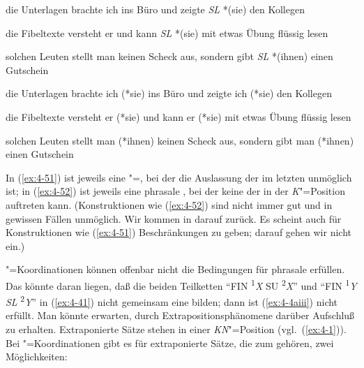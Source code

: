 \documentclass[output=paper]{langsci/langscibook}
\begin{document}
\begin{exe}
\ex
\label{ex:4-51}
\begin{xlist}
\ex%
\label{ex:4-51a}
die Unterlagen brachte ich ins Büro und zeigte \textit{SL} *(sie) den Kollegen

\ex%
\label{ex:4-51b}
die Fibeltexte versteht er und kann \textit{SL} *(sie) mit etwas Übung flüssig lesen

\ex%
\label{ex:4-51c}
solchen Leuten stellt man keinen Scheck aus, sondern gibt \textit{SL} *(ihnen) einen Gutschein
\end{xlist}
\ex
\label{ex:4-52}
\begin{xlist}
\ex%
\label{ex:4-52a}
die Unterlagen brachte ich (*sie) ins Büro und zeigte ich (*sie) den Kollegen


\ex%
\label{ex:4-52b}
die Fibeltexte versteht er (*sie) und kann er (*sie) mit etwas Übung flüssig lesen

\ex%
\label{ex:4-52c}
solchen Leuten stellt man (*ihnen) keinen Scheck aus, sondern gibt man (*ihnen) einen Gutschein
\end{xlist}
\end{exe}
In (\ref{ex:4-51}) ist jeweils eine "=, bei der die
Auslassung der  im letzten  unmöglich ist; in
(\ref{ex:4-52}) ist jeweils eine phrasale , bei der keine
 der  in der \textit{K}{}"=Position auftreten
kann. (Konstruktionen wie (\ref{ex:4-52}) sind nicht immer gut und in
gewissen Fällen unmöglich. Wir kommen in  darauf zurück. Es
scheint auch für Konstruktionen wie (\ref{ex:4-51}) Beschränkungen zu
geben; darauf gehen wir nicht ein.)

"=Koordinationen können offenbar nicht die Bedingungen für phrasale
 erfüllen. Das könnte daran liegen, daß die beiden
Teilketten "`FIN \textsuperscript{1}\textit{X} SU
\textsuperscript{2}\textit{X}"' und "`FIN \textsuperscript{1}\textit{Y}
\textit{SL} \textsuperscript{2}\textit{Y}"' in (\ref{ex:4-41}) nicht
gemeinsam eine  bilden; dann ist (\ref{ex:4-4aiii}) nicht
erfüllt. Man könnte erwarten, durch Extrapositionsphänomene darüber
Aufschluß zu erhalten. Extraponierte Sätze stehen in einer
\textit{KN}{}"=Position (vgl.\ (\ref{ex:4-1})). Bei "=Koordinationen
gibt es für extraponierte Sätze, die zum  gehören, zwei
Möglichkeiten:
\end{document}
